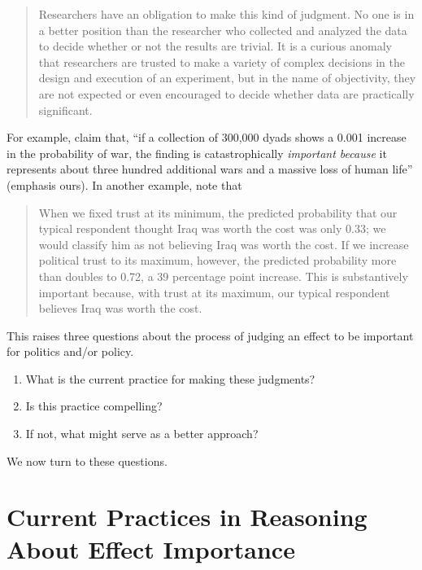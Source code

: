 \documentclass[12pt]{article}
\begin{document}
\begin{quote}
Researchers have an obligation to make this kind of judgment. No one is in a better position than the researcher who collected and analyzed the data to decide whether or not the results are trivial. It is a curious anomaly that researchers are trusted to make a variety of complex decisions in the design and execution of an experiment, but in the name of objectivity, they are not expected or even encouraged to decide whether data are practically significant.
\end{quote}

For example, \citet[p. 711]{KingZeng2001} claim that, ``if a collection of 300,000 dyads shows a 0.001 increase in the probability of war, the finding is catastrophically \emph{important because} it represents about three hundred additional wars and a massive loss of human life'' (emphasis ours). In another example, \citet[p. 317]{HetheringtonSuhay2011} note that 
\begin{quote}
When we fixed trust at its minimum, the predicted probability that our typical respondent thought Iraq was worth the cost was only 0.33; we would classify him as not believing Iraq was worth the cost. If we increase political trust to its maximum, however, the predicted probability more than doubles to 0.72, a 39 percentage point increase. This is substantively important because, with trust at its maximum, our typical respondent believes Iraq was worth the cost.
\end{quote}
This raises three questions about the process of judging an effect to be important for politics and/or policy.
\begin{enumerate}
\item What is the current practice for making these judgments?
\item Is this practice compelling?
\item If not, what might serve as a better approach?
\end{enumerate}
\noindent We now turn to these questions.

\section*{Current Practices in Reasoning About Effect Importance}

\end{document}
